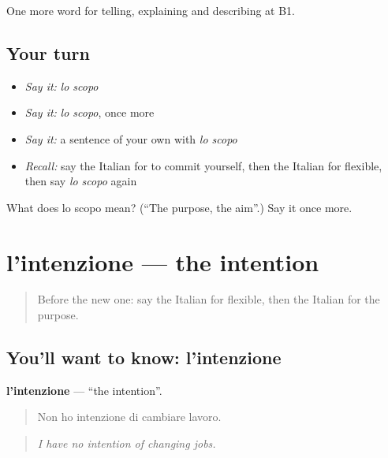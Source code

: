 \begin{grammarlens}[title={What you've built}]
One more word for telling, explaining and describing at B1.
\end{grammarlens}

\subsection*{Your turn}
\begin{itemize}
\raggedright
  \item \emph{Say it:} \emph{lo scopo}
  \item \emph{Say it:} \emph{lo scopo}, once more
  \item \emph{Say it:} a sentence of your own with \emph{lo scopo}
  \item \emph{Recall:} say the Italian for to commit yourself, then the Italian for flexible, then say \emph{lo scopo} again
\end{itemize}

\begin{tcolorbox}[breakable,colback=teal!4,colframe=teal!35!black,title={Before you move on}]
What does lo scopo mean? (\textquotedblleft{}The purpose, the aim\textquotedblright{}.) Say it once more.
\end{tcolorbox}
\section[l'intenzione]{l'intenzione — the intention}

\label{lesson:IT-C378-intenzione}



\begin{quote}
Before the new one: say the Italian for flexible, then the Italian for the purpose.
\end{quote}

\subsection*{You'll want to know: l'intenzione}
\textbf{l'intenzione} — \textquotedblleft{}the intention\textquotedblright{}.

\begin{quote}
Non ho intenzione di cambiare lavoro.
\end{quote}

\begin{quote}
\emph{I have no intention of changing jobs.}
\end{quote}

